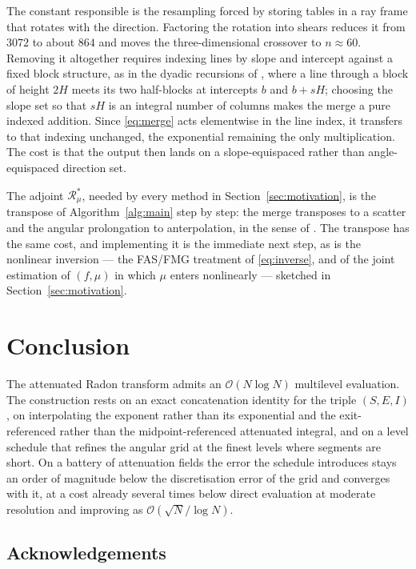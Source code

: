 \documentclass[11pt]{article}
\newcommand{\Rmu}{\mathcal{R}_{\mu}}
\newcommand{\bigO}{\mathcal{O}}
\begin{document}
The constant responsible is the resampling forced by storing tables in a ray
frame that rotates with the direction. Factoring the rotation into shears
reduces it from $3072$ to about $864$ and moves the three-dimensional crossover
to $n\approx60$. Removing it altogether requires indexing lines by slope and
intercept against a fixed block structure, as in the dyadic recursions of
\citep{gotz1996,brady1998,brandtdym1999}, where a line through a block of height
$2H$ meets its two half-blocks at intercepts $b$ and $b+sH$; choosing the slope
set so that $sH$ is an integral number of columns makes the merge a pure indexed
addition. Since \eqref{eq:merge} acts elementwise in the line index, it
transfers to that indexing unchanged, the exponential remaining the only
multiplication. The cost is that the output then lands on a slope-equispaced
rather than angle-equispaced direction set.

The adjoint $\Rmu^{*}$, needed by every method in
Section~\ref{sec:motivation}, is the transpose of Algorithm~\ref{alg:main}
step by step: the merge transposes to a scatter and the angular prolongation to
anterpolation, in the sense of \citep{brandtlubrecht1990}. The transpose has
the same cost, and implementing it is the immediate next step, as is the
nonlinear inversion --- the FAS/FMG treatment of \eqref{eq:inverse}, and of the
joint estimation of $(f,\mu)$ in which $\mu$ enters nonlinearly --- sketched in
Section~\ref{sec:motivation}.

\section{Conclusion}

The attenuated Radon transform admits an $\bigO(N\log N)$ multilevel
evaluation. The construction rests on an exact concatenation identity for the
triple $(S,E,I)$, on interpolating the exponent rather than its exponential and
the exit-referenced rather than the midpoint-referenced attenuated integral,
and on a level schedule that refines the angular grid at the finest levels
where segments are short. On a battery of attenuation fields the error the
schedule introduces stays an order of magnitude below the discretisation error
of the grid and converges with it, at a cost already several times below direct
evaluation at moderate resolution and improving as $\bigO(\sqrt{N}/\log N)$.

\subsection*{Acknowledgements}
\end{document}
